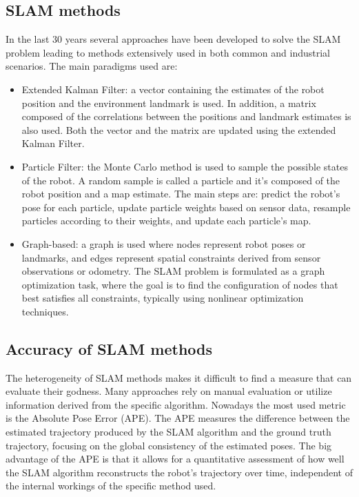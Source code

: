 \documentclass[a4paper]{article}
\begin{document}
\subsection{SLAM methods}
In the last 30 years several approaches have been developed to solve the SLAM problem leading to methods 
extensively used in both common and industrial scenarios. The main paradigms \cite{Stachniss2016} used are:
\begin{itemize}
    \item Extended Kalman Filter: a vector containing the estimates of the robot position and the environment 
    landmark is used. In addition, a matrix composed of the correlations between the positions and landmark
    estimates is also used. Both the vector and the matrix are updated using the extended Kalman Filter.
    \item Particle Filter: the Monte Carlo method is used to sample the possible states of the robot. A
    random sample is called a particle and it's composed of the robot position and a map estimate. The main 
    steps are: predict the robot’s pose for each particle, update particle weights based on sensor data,
    resample particles according to their weights, and update each particle’s map.
    \item Graph-based: a graph is used where nodes represent robot poses or landmarks, and edges represent
    spatial constraints derived from sensor observations or odometry. The SLAM problem is formulated as a 
    graph optimization task, where the goal is to find the configuration of nodes that best satisfies all 
    constraints, typically using nonlinear optimization techniques.
\end{itemize}

\subsection{Accuracy of SLAM methods}
The heterogeneity of SLAM methods makes it difficult to find a measure that can evaluate their godness.
Many approaches rely on manual evaluation or utilize information derived from the specific algorithm.
Nowadays the most used metric is the Absolute Pose Error (APE)\cite{APE}. The APE measures the difference between 
the estimated trajectory produced by the SLAM algorithm and the ground truth trajectory, focusing on the global 
consistency of the estimated poses. The big advantage of the APE is that it allows for a quantitative assessment 
of how well the SLAM algorithm reconstructs the robot's trajectory over time, independent of the internal workings 
of the specific method used.
\end{document}
